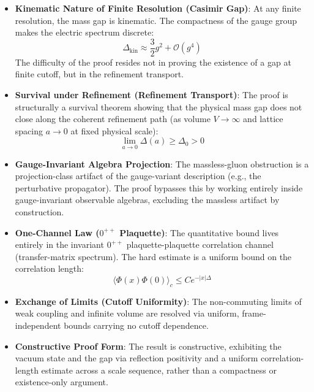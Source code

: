 \documentclass[11pt,a4paper]{article}
\begin{document}
\begin{itemize}
    \item[\textbf{C1}] \textbf{Kinematic Nature of Finite Resolution (Casimir Gap)}: 
    At any finite resolution, the mass gap is kinematic. The compactness of the gauge group makes the electric spectrum discrete:
    \begin{equation}
        \Delta_{\text{kin}} \approx \frac{3}{2} g^2 + \mathcal{O}(g^4)
    \end{equation}
    The difficulty of the proof resides not in proving the existence of a gap at finite cutoff, but in the refinement transport.
    
    \item[\textbf{C2}] \textbf{Survival under Refinement (Refinement Transport)}: 
    The proof is structurally a survival theorem showing that the physical mass gap does not close along the coherent refinement path (as volume $V \to \infty$ and lattice spacing $a \to 0$ at fixed physical scale):
    \begin{equation}
        \lim_{a \to 0} \Delta(a) \ge \Delta_0 > 0
    \end{equation}
    
    \item[\textbf{C3}] \textbf{Gauge-Invariant Algebra Projection}: 
    The massless-gluon obstruction is a projection-class artifact of the gauge-variant description (e.g., the perturbative propagator). The proof bypasses this by working entirely inside gauge-invariant observable algebras, excluding the massless artifact by construction.
    
    \item[\textbf{C4}] \textbf{One-Channel Law ($0^{++}$ Plaquette)}: 
    The quantitative bound lives entirely in the invariant $0^{++}$ plaquette-plaquette correlation channel (transfer-matrix spectrum). The hard estimate is a uniform bound on the correlation length:
    \begin{equation}
        \langle \Phi(x) \Phi(0) \rangle_c \le C e^{-|x| \Delta}
    \end{equation}
    
    \item[\textbf{C5}] \textbf{Exchange of Limits (Cutoff Uniformity)}: 
    The non-commuting limits of weak coupling and infinite volume are resolved via uniform, frame-independent bounds carrying no cutoff dependence.
    
    \item[\textbf{C6}] \textbf{Constructive Proof Form}: 
    The result is constructive, exhibiting the vacuum state and the gap via reflection positivity and a uniform correlation-length estimate across a scale sequence, rather than a compactness or existence-only argument.
\end{itemize}
\end{document}
